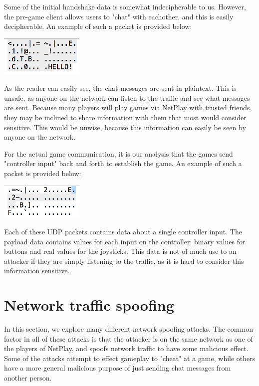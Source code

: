 \documentclass[conference]{IEEEtran}
\begin{document}
Some of the initial handshake data is somewhat indecipherable to us. 
However, the pre-game client allows users to "chat" with eachother, and this is easily decipherable. 
An example of such a packet is provided below:
\vspace{0.5cm}
\begin{center}
\includegraphics[width=4cm]{Figures/Packet2}
\end{center}
\vspace{0.5cm}

As the reader can easily see, the chat messages are sent in plaintext.
This is unsafe, as anyone on the network can listen to the traffic and see what messages are sent.
Because many players will play games via NetPlay with trusted friends, they may be inclined to share information with them that most would consider sensitive.
This would be unwise, because this information can easily be seen by anyone on the network.

For the actual game communication, it is our analysis that the games send "controller input" back and forth to establish the game. An example of such a packet is provided below:
\vspace{0.5cm}
\begin{center}
\includegraphics[width=4cm]{Figures/Packet}
\end{center}
\vspace{0.5cm}

Each of these UDP packets contains data about a single controller input.
The payload data contains values for each input on the controller: binary values for buttons and real values for the joysticks.
This data is not of much use to an attacker if they are simply listening to the traffic, as it is hard to consider this information sensitive. 

\section{Network traffic spoofing}
In this section, we explore many different network spoofing attacks.
The common factor in all of these attacks is that the attacker is on the same network as one of the players of NetPlay, and spoofs network traffic to have some malicious effect.
Some of the attacks attempt to effect gameplay to "cheat" at a game, while others have a more general malicious purpose of just sending chat messages from another person.
\end{document}
